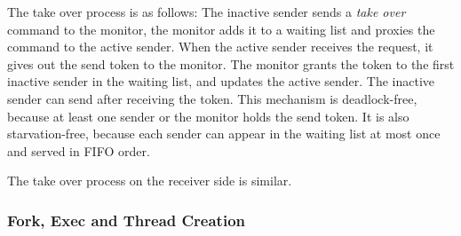The take over process is as follows:
The inactive sender sends a \emph{take over} command to the monitor, the monitor adds it to a waiting list and proxies the command to the active sender.
When the active sender receives the request, it gives out the send token to the monitor.
The monitor grants the token to the first inactive sender in the waiting list, and updates the active sender.
The inactive sender can send after receiving the token.
This mechanism is deadlock-free, because at least one sender or the monitor holds the send token.
It is also starvation-free, because each sender can appear in the waiting list at most once and served in FIFO order.

The take over process on the receiver side is similar.




\subsubsection{Fork, Exec and Thread Creation}
\label{subsubsec:fork_fork}
\quad

